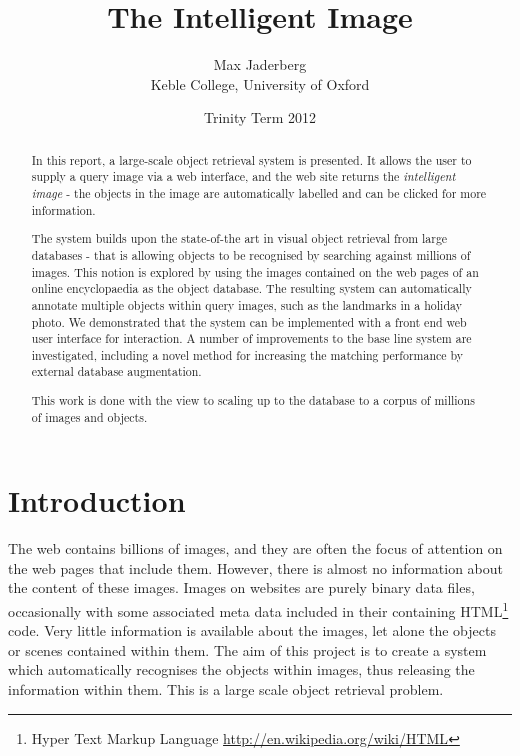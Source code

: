 \documentclass[11pt, onecolumn, a4paper, final]{report} %
\title{The Intelligent Image}
\author{Max Jaderberg\\
	Keble College, University of Oxford}
\date{Trinity Term 2012}
\begin{document}
\maketitle

\begin{abstract}

In this report, a large-scale object retrieval system is presented. It allows the user to supply a query image via a web interface, and the web site returns the \emph{intelligent image} - the objects in the image are automatically labelled and can be clicked for more information.

The system builds upon the state-of-the art in visual object retrieval from large databases - that is allowing objects to be recognised by searching against millions of images. This notion is explored by using the images contained on the web pages of an online encyclopaedia as the object database. The resulting system can automatically annotate multiple objects within query images, such as the landmarks in a holiday photo. We demonstrated that the system can be implemented with a front end web user interface for interaction. A number of improvements to the base line system are investigated, including a novel method for increasing the matching performance by external database augmentation.

This work is done with the view to scaling up to the database to a corpus of millions of images and objects.

\end{abstract}

\tableofcontents

\chapter{Introduction}
The web contains billions of images, and they are often the focus of attention on the web pages that include them. However, there is almost no information about the content of these images. Images on websites are purely binary data files, occasionally with some associated meta data included in their containing HTML\footnote{Hyper Text Markup Language \url{http://en.wikipedia.org/wiki/HTML}} code. Very little information is available about the images, let alone the objects or scenes contained within them. The aim of this project is to create a system which automatically recognises the objects within images, thus releasing the information within them. This is a large scale object retrieval problem.
\end{document}

